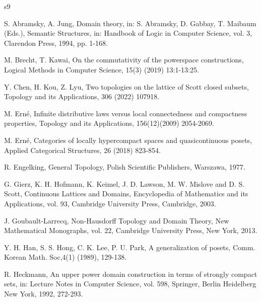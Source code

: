\documentclass[preprint,12pt]{elsarticle}
\numberwithin{equation}{section}
\begin{document}
\newpage
\begin{thebibliography}{s9}







\small {\baselineskip 0.07in


 S. Abramsky, A. Jung, Domain theory, in: S. Abramsky, D. Gabbay, T. Maibaum (Eds.), Semantic Structures, in: Handbook
of Logic in Computer Science, vol. 3, Clarendon Press, 1994, pp. 1-168.

 M. Brecht, T. Kawai, On the commutativity of the powerspace constructions, Logical Methods in Computer Science, 15(3) (2019)
13:1-13:25.

 Y. Chen, H. Kou, Z. Lyu, Two topologies on the lattice of Scott closed subsets, Topology and its Applications, 306 (2022) 107918.

 M. Ern\'{e}, Infinite distributive laws versus local connectedness and compactness properties, Topology and its Applications, 156(12)(2009) 2054-2069.

 M. Ern\'{e}, Categories of locally hypercompact spaces and quasicontinuous posets, Applied Categorical Structures, 26 (2018) 823-854.


 R. Engelking, General Topology, Polish Scientific Publishers, Warszawa, 1977.

 G. Gierz, K. H. Hofmann, K. Keimel, J. D. Lawson, M. W. Mislove and D. S. Scott, Continuous Lattices and Domains, Encyclopedia of Mathematics and its Applications, vol. 93, Cambridge University Press, Cambridge, 2003.

 J. Goubault-Larrecq, Non-Hausdorff Topology and Domain Theory, New Mathematical Monographs, vol. 22, Cambridge University Press, New York, 2013.


Y. H. Han, S. S. Hong, C. K. Lee, P. U. Park, A generalization of posets, Comm. Korean Math. Soc,4(1) (1989), 129-138.


 R. Heckmann, An upper power domain construction in terms of strongly compact sets, in: Lecture Notes in Computer
Science, vol. 598, Springer, Berlin Heidelberg New York, 1992, 272-293.



}
\end{thebibliography}
\end{document}
